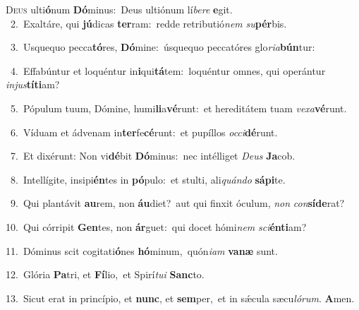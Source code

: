 \lettrine{\initial\textcolor{\initialcolor}{D}}{eus} ulti\-\textbf{ó}\-num \textbf{Dó}\-minus:~\star Deus ultiónum lí\-\textit{be}\-\textit{re} \textbf{e}\-git.\\
{\numbfont\textcolor{\numbcolor}{~2.}}~Exaltáre, qui \textbf{jú}\-dicas \textbf{ter}\-ram:~\star redde retributió\textit{nem} \textit{su}\-\textbf{pér}bis.\par
{\numbfont\textcolor{\numbcolor}{~3.}}~Usquequo pecca\-\textbf{tó}\-res, \textbf{Dó}\-mine:~\star úsquequo peccatóres glo\-\textit{ri}\-\textit{a}\textbf{bún}tur:\par
{\numbfont\textcolor{\numbcolor}{~4.}}~Effabúntur et loquéntur in\-\textbf{i}\-qui\-\textbf{tá}\-tem:~\star loquéntur omnes, qui operántur \textit{in}\-\textit{jus}\textbf{tí}\textbf{ti}am?\par
{\numbfont\textcolor{\numbcolor}{~5.}}~Pópulum tuum, Dómine, humi\-\textbf{li}\-a\-\textbf{vé}\-runt:~\star et hereditátem tuam \textit{ve}\-\textit{xa}\textbf{vé}runt.\par
{\numbfont\textcolor{\numbcolor}{~6.}}~Víduam et ádvenam in\-\textbf{ter}\-fe\-\textbf{cé}\-runt:~\star et pupíllos \textit{oc}\-\textit{ci}\textbf{dé}runt.\par
{\numbfont\textcolor{\numbcolor}{~7.}}~Et dixérunt: Non vi\-\textbf{dé}\-bit \textbf{Dó}\-minus:~\star nec intélliget \textit{De}\-\textit{us} \textbf{Ja}\-cob.\par
{\numbfont\textcolor{\numbcolor}{~8.}}~Intellígite, insipi\-\textbf{én}\-tes in \textbf{pó}\-pulo:~\star et stulti, ali\-\textit{quán}\-\textit{do} \textbf{sá}\-\textbf{pi}te.\par
{\numbfont\textcolor{\numbcolor}{~9.}}~Qui plantávit \textbf{au}\-rem, non \textbf{áu}\-diet?~\star aut qui finxit óculum, \textit{non} \textit{con}\-\textbf{sí}\textbf{de}rat?\par
{\numbfont\textcolor{\numbcolor}{10.}}~Qui córripit \textbf{Gen}\-tes, non \textbf{ár}\-guet:~\star qui docet hómi\textit{nem} \textit{sci}\-\textbf{én}\textbf{ti}am?\par
{\numbfont\textcolor{\numbcolor}{11.}}~Dóminus scit cogitati\-\textbf{ó}\-nes \textbf{hó}\-minum,~\star quón\-\textit{i}\-\textit{am} \textbf{va}\-\textbf{næ} sunt.\par
{\numbfont\textcolor{\numbcolor}{12.}}~Glória \textbf{Pa}\-tri, et \textbf{Fí}\-lio,~\star et Spirí\-\textit{tu}\-\textit{i} \textbf{Sanc}\-to.\par
{\numbfont\textcolor{\numbcolor}{13.}}~Sicut erat in princípio, et \textbf{nunc}\-, et \textbf{sem}\-per,~\star et in sǽcula sæcu\-\textit{ló}\-\textit{rum}. \textbf{A}\-men.\par
